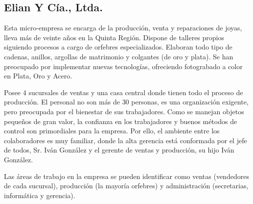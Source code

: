 
\subsection{Elian Y Cía., Ltda.}

Esta micro-empresa se encarga de la producción, venta y reparaciones de joyas, lleva más de veinte años en
la Quinta Región. Dispone de talleres propios siguiendo procesos a cargo de orfebres especializados.
Elaboran todo tipo de cadenas, anillos, argollas de matrimonio y colgantes (de oro y plata).
Se han preocupado por implementar nuevas tecnologías, ofreciendo fotograbado a color en Plata, Oro y
Acero.

Posee 4 sucursales de ventas y una casa central donde tienen todo el proceso de producción. El personal
no son más de 30 personas, es una organización exigente, pero preocupada por el bienestar de sus
trabajadores. Como se manejan objetos pequeños de gran valor, la confianza en los trabajadores y buenos
métodos de control son primordiales para la empresa. Por ello, el ambiente entre los colaboradores es muy
familiar, donde la alta gerencia está conformada por el jefe de todos, Sr. Iván González y el gerente de
ventas y producción, su hijo Iván González.

Las áreas de trabajo en la empresa se pueden identificar como
ventas (vendedores de cada sucursal), producción (la mayoría orfebres) y administración (secretarias, 
informática y gerencia).
